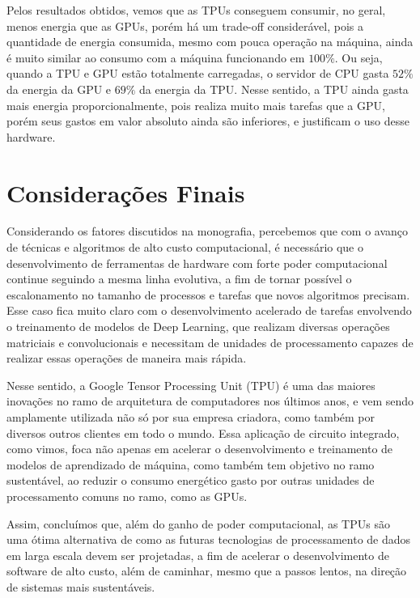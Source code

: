 \documentclass{report}
\begin{document}
Pelos resultados obtidos, vemos que as TPUs conseguem consumir, no geral, menos energia que as GPUs, porém há um trade-off considerável, pois a quantidade de energia consumida, mesmo com pouca operação na máquina, ainda é muito similar ao consumo com a máquina funcionando em $100\%$. Ou seja, quando a TPU e GPU estão totalmente carregadas, o servidor de CPU gasta $52\%$ da energia da GPU e $69\%$ da energia da TPU. Nesse sentido, a TPU ainda gasta mais energia proporcionalmente, pois realiza muito mais tarefas que a GPU, porém seus gastos em valor absoluto ainda são inferiores, e justificam o uso desse hardware.

\chapter{Considerações Finais}

Considerando os fatores discutidos na monografia, percebemos que com o avanço de técnicas e algoritmos de alto custo computacional, é necessário que o desenvolvimento de ferramentas de hardware com forte poder computacional continue seguindo a mesma linha evolutiva, a fim de tornar possível o escalonamento no tamanho de processos e tarefas que novos algoritmos precisam. Esse caso fica muito claro com o desenvolvimento acelerado de tarefas envolvendo o treinamento de modelos de Deep Learning, que realizam diversas operações matriciais e convolucionais e necessitam de unidades de processamento capazes de realizar essas operações de maneira mais rápida.

Nesse sentido, a Google Tensor Processing Unit (TPU) é uma das maiores inovações no ramo de arquitetura de computadores nos últimos anos, e vem sendo amplamente utilizada não só por sua empresa criadora, como também por diversos outros clientes em todo o mundo. Essa aplicação de circuito integrado, como vimos, foca não apenas em acelerar o desenvolvimento e treinamento de modelos de aprendizado de máquina, como também tem objetivo no ramo sustentável, ao reduzir o consumo energético gasto por outras unidades de processamento comuns no ramo, como as GPUs.

Assim, concluímos que, além do ganho de poder computacional, as TPUs são uma ótima alternativa de como as futuras tecnologias de processamento de dados em larga escala devem ser projetadas, a fim de acelerar o desenvolvimento de software de alto custo, além de caminhar, mesmo que a passos lentos, na direção de sistemas mais sustentáveis.



\end{document}
